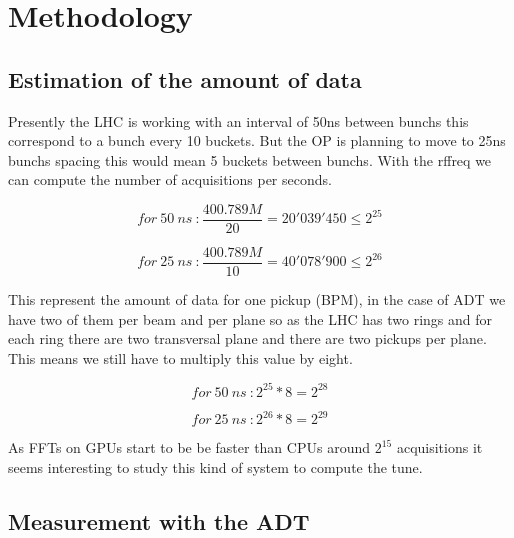 %

\chapter{Methodology}

\section{Estimation of the amount of data}

Presently the \gls{LHC} is working with an interval of 50ns between 
\glspl{bunch} this correspond to a bunch every 10 \glspl{bucket}. But the 
\gls{OP} is planning to move to 25ns \glspl{bunch} spacing this would mean 
5 \glspl{bucket} between \glspl{bunch}. With the \gls{rffreq} we can compute 
the number of acquisitions per seconds.

$$for~50~ns~: \frac{400.789M}{20} = 20'039'450 \leq 2^{25}$$

$$for~25~ns~: \frac{400.789M}{10} = 40'078'900 \leq 2^{26}$$ 

This represent the amount of data for one pickup (\gls{BPM}), in the case of 
\gls{ADT} we have two of them per beam and per plane so as the \gls{LHC} has 
two rings and for each ring there are two transversal plane and there are 
two pickups per plane. This means we still have to multiply this value by 
eight.

$$for~50~ns~: 2^{25} * 8 = 2^{28}$$

$$for~25~ns~: 2^{26} * 8 = 2^{29}$$

As \glspl{FFT} on \glspl{GPU} start to be be faster than \glspl{CPU} around 
$2^{15}$ acquisitions it seems interesting to study this kind of system to 
compute the \gls{tune}.

\section{Measurement with the ADT}

